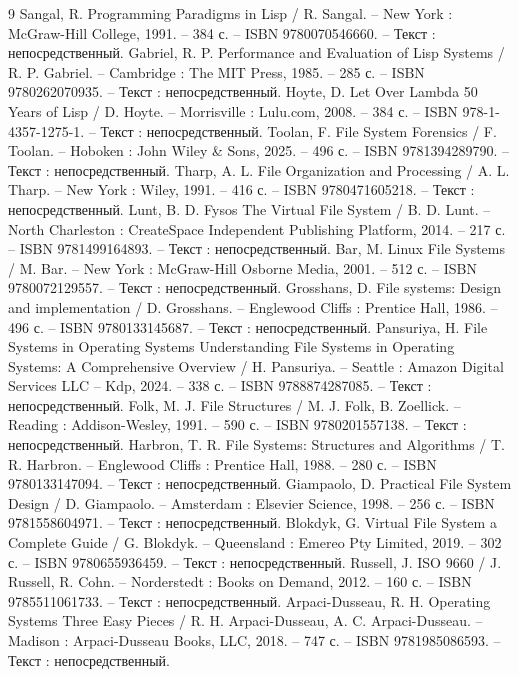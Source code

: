 \begin{thebibliography}{9}
    Sangal, R. Programming Paradigms in Lisp / R. Sangal. -- New York : McGraw-Hill College, 1991. -- 384 с. -- ISBN 9780070546660. -- Текст : непосредственный.
    Gabriel, R. P. Performance and Evaluation of Lisp Systems / R. P. Gabriel. -- Cambridge : The MIT Press, 1985. -- 285 с. -- ISBN 9780262070935. -- Текст : непосредственный.
    Hoyte, D. Let Over Lambda 50 Years of Lisp / D. Hoyte. -- Morrisville : Lulu.com, 2008. -- 384 с. -- ISBN 978-1-4357-1275-1. -- Текст : непосредственный.
    Toolan, F. File System Forensics / F. Toolan. -- Hoboken : John Wiley \& Sons, 2025. -- 496 с. -- ISBN 9781394289790. -- Текст : непосредственный.
    Tharp, A. L. File Organization and Processing / A. L. Tharp. -- New York : Wiley, 1991. -- 416 с. -- ISBN 9780471605218. -- Текст : непосредственный.
    Lunt, B. D. Fysos The Virtual File System / B. D. Lunt. -- North Charleston : CreateSpace Independent Publishing Platform, 2014. -- 217 с. -- ISBN 9781499164893. -- Текст : непосредственный.
    Bar, M. Linux File Systems / M. Bar. -- New York : McGraw-Hill Osborne Media, 2001. -- 512 с. -- ISBN 9780072129557. -- Текст : непосредственный.
    Grosshans, D. File systems: Design and implementation / D. Grosshans. -- Englewood Cliffs : Prentice Hall, 1986. -- 496 с. -- ISBN 9780133145687. -- Текст : непосредственный.
    Pansuriya, H. File Systems in Operating Systems Understanding File Systems in Operating Systems: A Comprehensive Overview / H. Pansuriya. -- Seattle : Amazon Digital Services LLC -- Kdp, 2024. -- 338 с. -- ISBN 9788874287085. -- Текст : непосредственный.
    Folk, M. J. File Structures / M. J. Folk, B. Zoellick. -- Reading : Addison-Wesley, 1991. -- 590 с. -- ISBN 9780201557138. -- Текст : непосредственный.
    Harbron, T. R. File Systems: Structures and Algorithms / T. R. Harbron. -- Englewood Cliffs : Prentice Hall, 1988. -- 280 с. -- ISBN 9780133147094. -- Текст : непосредственный.
    Giampaolo, D. Practical File System Design / D. Giampaolo. -- Amsterdam : Elsevier Science, 1998. -- 256 с. -- ISBN 9781558604971. -- Текст : непосредственный.
    Blokdyk, G. Virtual File System a Complete Guide / G. Blokdyk. -- Queensland : Emereo Pty Limited, 2019. -- 302 с. -- ISBN 9780655936459. -- Текст : непосредственный.
    Russell, J. ISO 9660 / J. Russell, R. Cohn. -- Norderstedt : Books on Demand, 2012. -- 160 с. -- ISBN 9785511061733. -- Текст : непосредственный.
    Arpaci-Dusseau, R. H. Operating Systems Three Easy Pieces / R. H. Arpaci-Dusseau, A. C. Arpaci-Dusseau. -- Madison : Arpaci-Dusseau Books, LLC, 2018. -- 747 с. -- ISBN 9781985086593. -- Текст : непосредственный.

\end{thebibliography}
